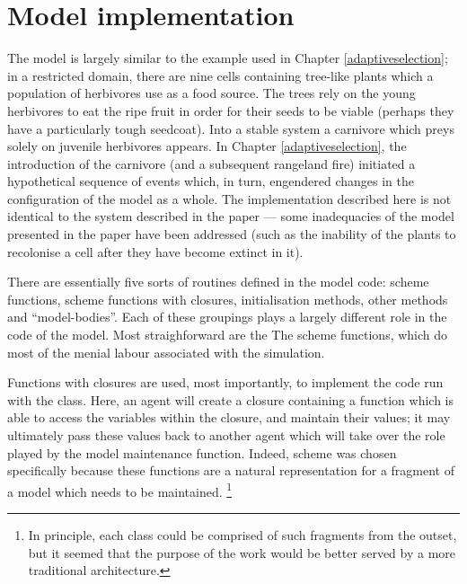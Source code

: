 \section{Model implementation}

The model is largely similar to the example used in Chapter
\ref{adaptiveselection}; in a restricted domain, there are nine cells
containing tree-like plants which a population of herbivores use as a
food source.  The trees rely on the young herbivores to eat the ripe
fruit in order for their seeds to be viable (perhaps they have a
particularly tough seedcoat). Into a stable system a carnivore which
preys solely on juvenile herbivores appears.  In Chapter
\ref{adaptiveselection}, the introduction of the carnivore (and a
subsequent rangeland fire) initiated a hypothetical sequence of events
which, in turn, engendered changes in the configuration of the model
as a whole.  The implementation described here is not identical to the
system described in the paper --- some inadequacies of the model
presented in the paper have been addressed (such as the inability of
the plants to recolonise a cell after they have become extinct in
it).

There are essentially five sorts of routines defined in the model
code: scheme functions, scheme functions with closures, initialisation
methods, other methods and ``model-bodies''.  Each of these groupings
plays a largely different role in the code of the model. Most
straighforward are the The scheme functions, which do most of the
menial labour associated with the simulation.

Functions with closures are used, most importantly, to implement the
code run with the  class. Here, an agent will
create a closure containing a function which is able to access the
variables within the closure, and maintain their values; it may
ultimately pass these values back to another agent which will take
over the role played by the model maintenance function.  Indeed,
scheme was chosen specifically because these functions are a natural
representation for a fragment of a model which needs to be
maintained. \footnote{In principle, each class could be comprised of such
fragments from the outset, but it seemed that the purpose of the
work would be better served by a more traditional architecture.}

